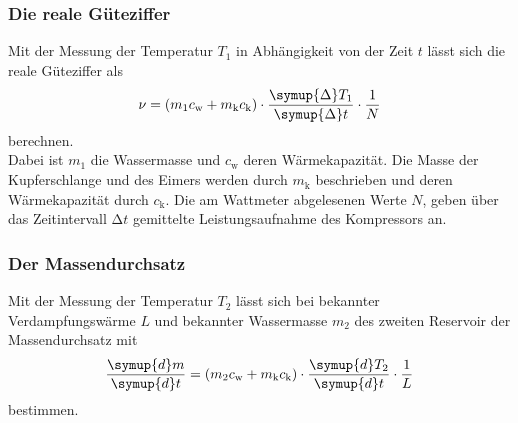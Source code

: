 \subsubsection{Die reale Güteziffer}
Mit der Messung der Temperatur $T_1$ in Abhängigkeit von der Zeit $t$ lässt sich die reale Güteziffer als 
\begin{equation}
    \nu = (m_1 c_\text{w} + m_\text{k} c_\text{k})\cdot 
    \frac{\symup{\Delta} T_1}{\symup{\Delta} t} \cdot \frac{1}{N}
    \label{eqn:Güteziffer}
\end{equation}
berechnen.\\
Dabei ist $m_1$ die Wassermasse und $c_\text{w}$ deren Wärmekapazität. Die Masse der Kupferschlange und des Eimers werden durch $m_\text{k}$ beschrieben und deren Wärmekapazität
durch $c_\text{k}$. Die am Wattmeter abgelesenen Werte $N$, geben über das Zeitintervall $\increment t$ gemittelte Leistungsaufnahme des Kompressors an.

\subsubsection{Der Massendurchsatz}
Mit der Messung der Temperatur $T_2$ lässt sich bei bekannter Verdampfungswärme $L$ und bekannter Wassermasse $m_2$ des zweiten Reservoir der Massendurchsatz mit
\begin{equation}
    \frac{\symup{d} m}{\symup{d}t} = (m_2 c_\text{w} + m_\text{k} c_\text{k}) \cdot 
    \frac{\symup{d} T_2}{\symup{d}t} \cdot  \frac{1}{L}
    \label{eqn:Massendurchsatz}
\end{equation}
bestimmen.
